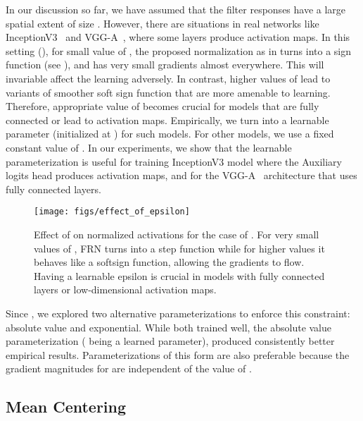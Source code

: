 \documentclass[10pt,twocolumn,letterpaper]{article}
\newcommand{\momentnorm}{FRN}
\begin{document}
In our discussion so far, we have assumed that the filter responses have a large spatial extent of size . However, there are situations in real networks like InceptionV3~\cite{inceptionv3} and VGG-A~\cite{vggnet}, where some layers produce  activation maps. In this setting (), for small value of , the proposed normalization as in  turns into a sign function (see ), and has very small gradients almost everywhere. This will invariable affect the learning adversely. In contrast, higher values of  lead to variants of smoother soft sign function that are more amenable to learning. Therefore, appropriate value of  becomes crucial for models that are fully connected or lead to  activation maps. Empirically, we turn  into a learnable parameter (initialized at ) for such models. For other models, we use a fixed constant value of . In our experiments, we show that the learnable parameterization is useful for training InceptionV3 model where the Auxiliary logits head produces  activation maps, and for the VGG-A~\cite{vggnet} architecture that uses fully connected layers.

\begin{figure}[t]
\begin{center}
   \texttt{[image: figs/effect\_of\_epsilon]}
\end{center}
\vspace{-0.6cm}
   \caption{Effect of  on normalized activations for the case of . For very small values of , \momentnorm{} turns into a step function while for higher values it behaves like a softsign function, allowing the gradients to flow. Having a learnable epsilon is crucial in models with fully connected layers or low-dimensional activation maps.}
\label{fig:lambdaeffect}
\vspace{-0.4cm}
\end{figure}


\medskip
\noindent
Since , we explored two alternative parameterizations to enforce this constraint: absolute value and exponential. While both trained well, the absolute value parameterization  ( being a learned parameter), produced consistently better empirical results. Parameterizations of this form are also preferable because the gradient magnitudes for  are independent of the value of .

\subsection{Mean Centering}
\label{sec:mean_centering}
\end{document}
